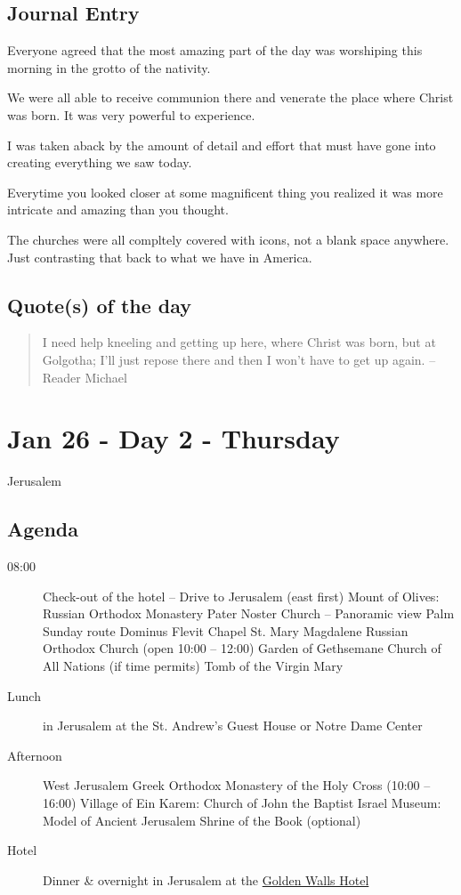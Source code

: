\documentclass[letterpaper]{report}
\begin{document}
\clearpage
\begin{multicols}{2}
\subsection{Journal Entry}
Everyone agreed that the most amazing part of the day was worshiping this morning in
the grotto of the nativity.

We were all able to receive communion there and venerate the place where Christ was born.
It was very powerful to experience.

I was taken aback by the amount of detail and effort that must have gone into creating everything we saw today.

Everytime you looked closer at some magnificent thing you realized it was more intricate and amazing than you thought.

The churches were all compltely covered with icons, not a blank space anywhere.  Just contrasting that back to what we have in America.

\subsection{Quote(s) of the day}
\begin{quote}
 I need help kneeling and getting up here, where Christ was born, but at Golgotha;
I'll just repose there and then I won't have to get up again.
-- Reader Michael
\end{quote}
\end{multicols}

\clearpage
\section{Jan 26 - Day 2 - Thursday}
Jerusalem
\subsection{Agenda}
\begin{description}
	\item[08:00] Check-out of the hotel – Drive to Jerusalem (east first)
	    \subitem Mount of Olives: Russian Orthodox Monastery
	    \subitem Pater Noster Church -- Panoramic view
	    \subitem Palm Sunday route
	    \subitem Dominus Flevit Chapel
	    \subitem St. Mary Magdalene Russian Orthodox Church
	        (open 10:00 – 12:00)
	    \subitem Garden of Gethsemane
	    \subitem Church of All Nations (if time permits)
	    \subitem Tomb of the Virgin Mary
	\item[Lunch] in Jerusalem at the
			St. Andrew’s Guest House or Notre Dame Center
	\item[Afternoon] West Jerusalem
	    \subitem Greek Orthodox Monastery of the Holy Cross (10:00 – 16:00)
		\subitem Village of Ein Karem: Church of John the Baptist 
		\subitem Israel Museum: Model of Ancient Jerusalem
		\subitem Shrine of the Book (optional)
	\item[Hotel] Dinner \& overnight in Jerusalem at the
	    \href{http://goldenwalls.com/}{Golden Walls Hotel}
\end{description}
\end{document}
